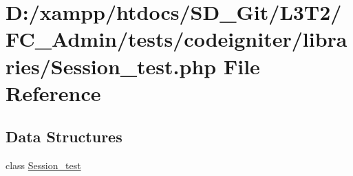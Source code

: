 \hypertarget{_admin_2tests_2codeigniter_2libraries_2_session__test_8php}{}\section{D\+:/xampp/htdocs/\+S\+D\+\_\+\+Git/\+L3\+T2/\+F\+C\+\_\+\+Admin/tests/codeigniter/libraries/\+Session\+\_\+test.php File Reference}
\label{_admin_2tests_2codeigniter_2libraries_2_session__test_8php}
\subsection*{Data Structures}
\begin{DoxyCompactItemize}
\item 
class \hyperlink{class_session__test}{Session\+\_\+test}
\end{DoxyCompactItemize}
